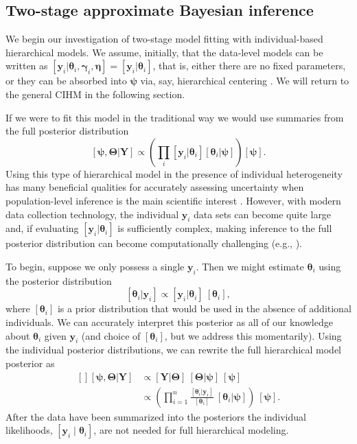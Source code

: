 \documentclass[12pt]{article}
\newcommand{\by}{\mathbf{y}}
\newcommand{\bt}{\boldsymbol{\theta}}
\newcommand{\bn}{\boldsymbol{\eta}}
\newcommand{\bT}{\boldsymbol{\Theta}}
\newcommand{\bp}{\boldsymbol{\psi}}
\newcommand{\bg}{\boldsymbol{\gamma}}
\newcommand{\bY}{\mathbf{Y}}
\begin{document}
\subsection{Two-stage approximate Bayesian inference}

We begin our investigation of two-stage model fitting with individual-based hierarchical models. We assume, initially, that the data-level models can be written as $[\by_i|\bt_i, \bg_i, \bn]=[\by_i|\bt_i]$, that is, either there are no fixed parameters, or they can be absorbed into $\bp$ via, say, hierarchical centering \citep{Gelfand:1996zq}. We will return to the general CIHM in the following section. 

If we were to fit this model in the traditional way we would use summaries from the full posterior distribution 
\[
[\bp, \bT|\bY] \propto \left(\prod_i[\by_i|\bt_i][\bt_i|\bp]\right) [\bp].
\]
Using this type of hierarchical model in the presence of individual heterogeneity has many beneficial qualities for accurately assessing uncertainty when population-level inference is the main scientific interest \citep{Cressie:2009rr}. However, with modern data collection technology, the individual $\by_i$ data sets can become quite large and, if evaluating $[\by_i|\bt_i]$ is sufficiently complex, making inference to the full posterior distribution can become computationally challenging (e.g., \citealt{hooten2016hierarchical}).

To begin, suppose we only possess a single $\by_i$. Then we might estimate $\bt_i$ using the posterior distribution
\[
[\bt_i|\by_i] \propto [\by_i|\bt_i]\ [\bt_i],
\]
where $[\bt_i]$ is a prior distribution that would be used in the absence of additional individuals. We can accurately interpret this posterior as all of our knowledge about $\bt_i$ given $\by_i$ (and choice of $[\bt_i]$, but we address this momentarily). Using the individual posterior distributions, we can rewrite the full hierarchical model posterior as 
\begin{equation}
\label{eq:post}
\begin{aligned}[]
[\bp,\bT|\bY] &\propto [\bY|\bT]\ [\bT|\bp]\ [\bp]\\
& \propto \left(\prod_{i=1}^n\frac{[\bt_i|\by_i]}{[\bt_i]}\ [\bt_i|\bp]\right)\ [\bp].
\end{aligned}
\end{equation}
After the data have been summarized into the posteriors the individual likelihoods, $\left[ \by_i \mid \bt_i \right]$, are not needed for full hierarchical modeling. 
\end{document}
